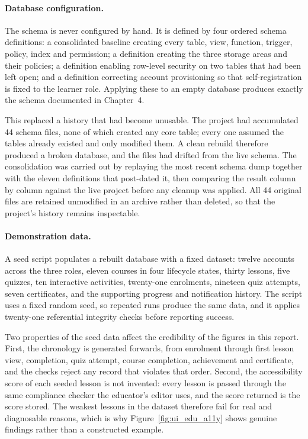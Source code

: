 \documentclass[12pt, oneside]{article} %
\begin{document}
\paragraph{Database configuration.} The schema is never configured by hand. It is defined by four ordered schema definitions: a consolidated baseline creating every table, view, function, trigger, policy, index and permission; a definition creating the three storage areas and their policies; a definition enabling row-level security on two tables that had been left open; and a definition correcting account provisioning so that self-registration is fixed to the learner role. Applying these to an empty database produces exactly the schema documented in Chapter~4.

This replaced a history that had become unusable. The project had accumulated 44 schema files, none of which created any core table; every one assumed the tables already existed and only modified them. A clean rebuild therefore produced a broken database, and the files had drifted from the live schema. The consolidation was carried out by replaying the most recent schema dump together with the eleven definitions that post-dated it, then comparing the result column by column against the live project before any cleanup was applied. All 44 original files are retained unmodified in an archive rather than deleted, so that the project's history remains inspectable.

\paragraph{Demonstration data.} A seed script populates a rebuilt database with a fixed dataset: twelve accounts across the three roles, eleven courses in four lifecycle states, thirty lessons, five quizzes, ten interactive activities, twenty-one enrolments, nineteen quiz attempts, seven certificates, and the supporting progress and notification history. The script uses a fixed random seed, so repeated runs produce the same data, and it applies twenty-one referential integrity checks before reporting success.

Two properties of the seed data affect the credibility of the figures in this report. First, the chronology is generated forwards, from enrolment through first lesson view, completion, quiz attempt, course completion, achievement and certificate, and the checks reject any record that violates that order. Second, the accessibility score of each seeded lesson is not invented: every lesson is passed through the same compliance checker the educator's editor uses, and the score returned is the score stored. The weakest lessons in the dataset therefore fail for real and diagnosable reasons, which is why Figure~\ref{fig:ui_edu_a11y} shows genuine findings rather than a constructed example.
\end{document}
